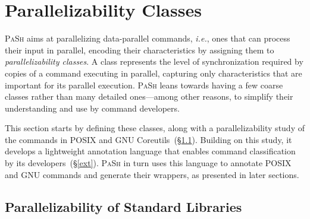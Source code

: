 \documentclass[sigplan, review, screen, anonymous]{acmart}
\newcommand{\ie}{{\em i.e.}, }
\newcommand{\kk}[1]{[{\color{magenta}kk: #1}]}
\newcommand{\sx}[1]{(\S\ref{#1})}
\newcommand{\sys}{{\scshape PaSh}\xspace}
\begin{document}


\section{Parallelizability Classes}
\label{parallelizability}

\sys aims at parallelizing data-parallel commands, \ie ones that can process their input in parallel, encoding their characteristics by assigning them to
\emph{parallelizability classes}.
A class represents the level of synchronization required by copies of a command executing in parallel, 
  capturing only characteristics that are important for its parallel execution. %
\sys leans towards having a few coarse classes rather than many detailed ones---among other reasons, to simplify their understanding and use by command developers.

This section starts by defining these classes, along with a parallelizability study of the commands in {\sc POSIX} and GNU Coreutils~\sx{cmd}.
Building on this study, it develops a lightweight annotation language that enables command classification by its developers~\sx{ext}.
\sys in turn uses this language to annotate POSIX and GNU commands and generate their wrappers, as presented in later sections.

\subsection{Parallelizability of Standard Libraries}
\label{cmd}
\end{document}
